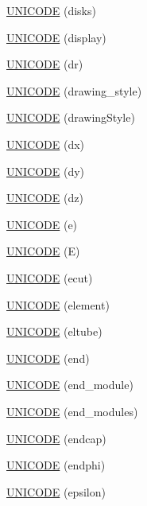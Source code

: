 \begin{DoxyCompactItemize}
\item 
\hyperlink{namespace_d_d4hep_1_1_x_m_l_ac71faf9bffd40868e3e3d4af7a04ee27}{UNICODE} (disks)
\item 
\hyperlink{namespace_d_d4hep_1_1_x_m_l_a8466aab9e167c4e071161eadadba94af}{UNICODE} (display)
\item 
\hyperlink{namespace_d_d4hep_1_1_x_m_l_ad4c3ac2510eaeef496cf8a075a3231dc}{UNICODE} (dr)
\item 
\hyperlink{namespace_d_d4hep_1_1_x_m_l_a9e58172414cd3b231ebf29cb2395bcf5}{UNICODE} (drawing\_\-style)
\item 
\hyperlink{namespace_d_d4hep_1_1_x_m_l_a89e98aa63dcfc0c7b304680e58580c8f}{UNICODE} (drawingStyle)
\item 
\hyperlink{namespace_d_d4hep_1_1_x_m_l_adadf4d5b7da03dcbd4e4cd72ef9d950c}{UNICODE} (dx)
\item 
\hyperlink{namespace_d_d4hep_1_1_x_m_l_a75080433f03e6865b56e37aab34d368e}{UNICODE} (dy)
\item 
\hyperlink{namespace_d_d4hep_1_1_x_m_l_ab5297e38b4c516b1c9788750b2bc877a}{UNICODE} (dz)
\item 
\hyperlink{namespace_d_d4hep_1_1_x_m_l_a9fb3841cc02ceae3c888be5d6546e675}{UNICODE} (e)
\item 
\hyperlink{namespace_d_d4hep_1_1_x_m_l_a0874067e7206a319be9e71cfd47318ed}{UNICODE} (E)
\item 
\hyperlink{namespace_d_d4hep_1_1_x_m_l_a589a8a5c3603d6307296280f4cb57ba0}{UNICODE} (ecut)
\item 
\hyperlink{namespace_d_d4hep_1_1_x_m_l_a84c0ac1394a5335a051a2da0e01c9356}{UNICODE} (element)
\item 
\hyperlink{namespace_d_d4hep_1_1_x_m_l_a8f000ee2b91c21acb1583c9eb9ec74a8}{UNICODE} (eltube)
\item 
\hyperlink{namespace_d_d4hep_1_1_x_m_l_af964c103691c510213490e00e9373639}{UNICODE} (end)
\item 
\hyperlink{namespace_d_d4hep_1_1_x_m_l_a4ccbcefdca64e3237cce356697a67003}{UNICODE} (end\_\-module)
\item 
\hyperlink{namespace_d_d4hep_1_1_x_m_l_a71896f19880670155b5a791f993445f0}{UNICODE} (end\_\-modules)
\item 
\hyperlink{namespace_d_d4hep_1_1_x_m_l_ad2fa7fd572a2aff53ee1a32481231d97}{UNICODE} (endcap)
\item 
\hyperlink{namespace_d_d4hep_1_1_x_m_l_a8a8945afa2abad567660f2300ddd57ac}{UNICODE} (endphi)
\item 
\hyperlink{namespace_d_d4hep_1_1_x_m_l_a58d4a2a7ccdbb17384af3ca5b3730015}{UNICODE} (epsilon)

\end{DoxyCompactItemize}
